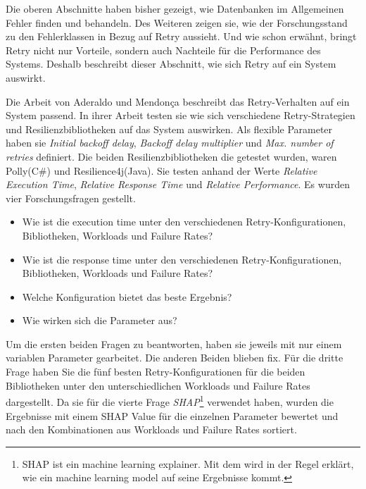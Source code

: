 
Die oberen Abschnitte haben bisher gezeigt, wie Datenbanken im Allgemeinen Fehler finden und behandeln.
Des Weiteren zeigen sie, wie der Forschungsstand zu den Fehlerklassen in Bezug auf Retry aussieht.
Und wie schon erwähnt, bringt Retry nicht nur Vorteile, sondern auch Nachteile für die Performance des Systems.
Deshalb beschreibt dieser Abschnitt, wie sich Retry auf ein System auswirkt.

Die Arbeit von Aderaldo und Mendonça beschreibt das Retry-Verhalten auf ein System passend.
In ihrer Arbeit testen sie wie sich verschiedene Retry-Strategien und Resilienzbibliotheken auf das System auswirken.
Als flexible Parameter haben sie \emph{Initial backoff delay}, \emph{Backoff delay multiplier} und
\emph{Max. number of retries} definiert.
Die beiden Resilienzbibliotheken die getestet wurden, waren Polly(C\#) und Resilience4j(Java).
Sie testen anhand der Werte \emph{Relative Execution Time}, \emph{Relative Response Time} und
\emph{Relative Performance}.
Es wurden vier Forschungsfragen gestellt.
\begin{itemize}
	\item Wie ist die execution time unter den verschiedenen Retry-Konfigurationen, Bibliotheken, Workloads und
	Failure Rates?
	\item Wie ist die response time unter den verschiedenen Retry-Konfigurationen, Bibliotheken, Workloads und
	Failure Rates?
	\item Welche Konfiguration bietet das beste Ergebnis?
	\item Wie wirken sich die Parameter aus?
\end{itemize}
Um die ersten beiden Fragen zu beantworten, haben sie jeweils mit nur einem variablen Parameter gearbeitet.
Die anderen Beiden blieben fix.
Für die dritte Frage haben Sie die fünf besten Retry-Konfigurationen für die beiden Bibliotheken unter den
unterschiedlichen Workloads und Failure Rates dargestellt.
Da sie für die vierte Frage \emph{SHAP}\footnote{SHAP ist ein machine learning explainer. Mit dem wird in der Regel
	erklärt, wie ein machine learning model auf seine Ergebnisse kommt.} verwendet haben, wurden die Ergebnisse mit
einem SHAP Value für die einzelnen Parameter bewertet und nach den Kombinationen aus Workloads und Failure Rates
sortiert.

